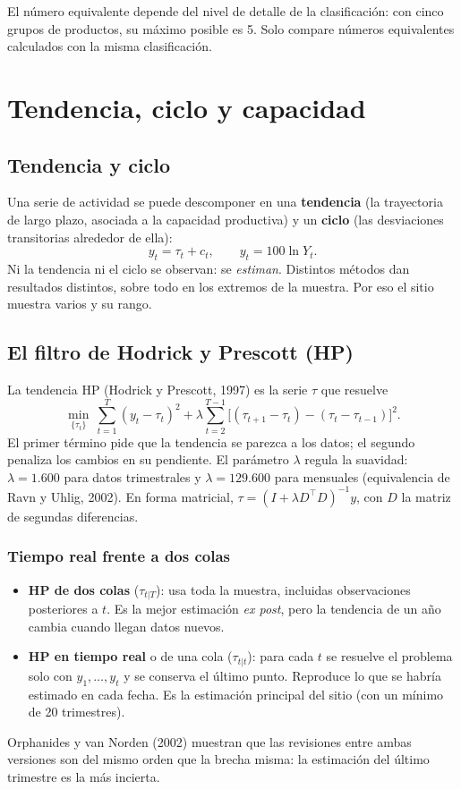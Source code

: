\begin{alerta}
El número equivalente depende del nivel de detalle de la clasificación: con cinco grupos de productos, su máximo
posible es 5. Solo compare números equivalentes calculados con la misma clasificación.
\end{alerta}

\chapter{Tendencia, ciclo y capacidad}
\label{es:f:ciclo}

\section{Tendencia y ciclo}
Una serie de actividad se puede descomponer en una \textbf{tendencia} (la trayectoria de largo plazo, asociada a
la capacidad productiva) y un \textbf{ciclo} (las desviaciones transitorias alrededor de ella):
\[
y_t=\tau_t+c_t,\qquad y_t=100\ln Y_t .
\]
Ni la tendencia ni el ciclo se observan: se \emph{estiman}. Distintos métodos dan resultados distintos, sobre todo
en los extremos de la muestra. Por eso el sitio muestra varios y su rango.

\section{El filtro de Hodrick y Prescott (HP)}
\label{es:f:hp}
La tendencia HP (Hodrick y Prescott, 1997) es la serie $\tau$ que resuelve
\[
\min_{\{\tau_t\}}\ \sum_{t=1}^{T}(y_t-\tau_t)^2+\lambda\sum_{t=2}^{T-1}\big[(\tau_{t+1}-\tau_t)-(\tau_t-\tau_{t-1})\big]^2 .
\]
El primer término pide que la tendencia se parezca a los datos; el segundo penaliza los cambios en su pendiente. El
parámetro $\lambda$ regula la suavidad: $\lambda=1.600$ para datos trimestrales y $\lambda=129.600$ para mensuales
(equivalencia de Ravn y Uhlig, 2002). En forma matricial, $\tau=(I+\lambda D^\top D)^{-1}y$, con $D$ la matriz de
segundas diferencias.

\subsection{Tiempo real frente a dos colas}
\begin{itemize}
\item \textbf{HP de dos colas} ($\tau_{t|T}$): usa toda la muestra, incluidas observaciones posteriores a $t$. Es
  la mejor estimación \emph{ex post}, pero la tendencia de un año cambia cuando llegan datos nuevos.
\item \textbf{HP en tiempo real} o de una cola ($\tau_{t|t}$): para cada $t$ se resuelve el problema solo con
  $y_1,\dots,y_t$ y se conserva el último punto. Reproduce lo que se habría estimado en cada fecha. Es la
  estimación principal del sitio (con un mínimo de 20 trimestres).
\end{itemize}
Orphanides y van Norden (2002) muestran que las revisiones entre ambas versiones son del mismo orden que la brecha
misma: la estimación del último trimestre es la más incierta.

